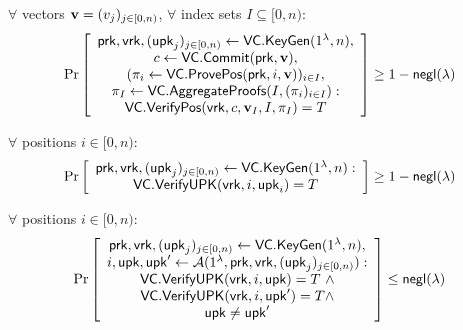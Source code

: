 \begin{definition}
    \label{def:vc:aggregation-correctness}
    $\forall$ vectors $\bm{\mathrm{v}}=(v_j)_{j\in [0,n)}$, $\forall$ index sets $I\subseteq[0,n)$:
    \begin{align*}
    \Pr \left[ \begin{array}{c}
    \mathsf{prk},\mathsf{vrk},(\mathsf{upk}_j)_{j\in[0,n)}\leftarrow \mathsf{VC}.\mathsf{KeyGen}(1^\lambda, n), \\
    c \leftarrow \mathsf{VC}.\mathsf{Commit}(\mathsf{prk},\bm{\mathrm{v}}),\\
    (\pi_i \leftarrow \mathsf{VC}.\mathsf{ProvePos}(\mathsf{prk}, i, \bm{\mathrm{v}}))_{i\in I},\\
    \pi_I \leftarrow \mathsf{VC}.\mathsf{AggregateProofs}(I, (\pi_i)_{i\in I}):\\
    \mathsf{VC}.\mathsf{VerifyPos}(\mathsf{vrk}, c, \bm{\mathrm{v}}_I, I, \pi_I) = T
    \end{array} \right] \ge 1 - \mathsf{negl}(\lambda)
    \end{align*}
\end{definition}

\begin{definition}
    $\forall$ positions $i\in[0,n)$:
    \begin{align*}
    \Pr \left[ \begin{array}{c}
    \mathsf{prk},\mathsf{vrk},(\mathsf{upk}_j)_{j\in[0,n)} \leftarrow \mathsf{VC}.\mathsf{KeyGen}(1^\lambda, n):\\
    \mathsf{VC}.\mathsf{VerifyUPK}(\mathsf{vrk}, i, \mathsf{upk}_i) = T
    \end{array} \right] \ge 1 - \mathsf{negl}(\lambda)
    \end{align*}
\end{definition}

\begin{definition}
    \label{def:vc:update-key-uniquness}
    $\forall$ positions $i\in[0,n)$:
    \begin{align*}
    \Pr \left[ \begin{array}{c}
    \mathsf{prk},\mathsf{vrk},(\mathsf{upk}_j)_{j\in[0,n)} \leftarrow \mathsf{VC}.\mathsf{KeyGen}(1^\lambda, n),\\
    i, \mathsf{upk},\mathsf{upk}' \leftarrow \mathcal{A}(1^\lambda, \mathsf{prk},\mathsf{vrk},(\mathsf{upk}_j)_{j\in[0,n)}):\\
    \mathsf{VC}.\mathsf{VerifyUPK}(\mathsf{vrk}, i, \mathsf{upk}) = T\ \wedge \\
    \mathsf{VC}.\mathsf{VerifyUPK}(\mathsf{vrk}, i, \mathsf{upk}') = T \wedge \\
    \mathsf{upk} \ne \mathsf{upk}'
    \end{array} \right] \le \mathsf{negl}(\lambda)
    \end{align*}
\end{definition}

